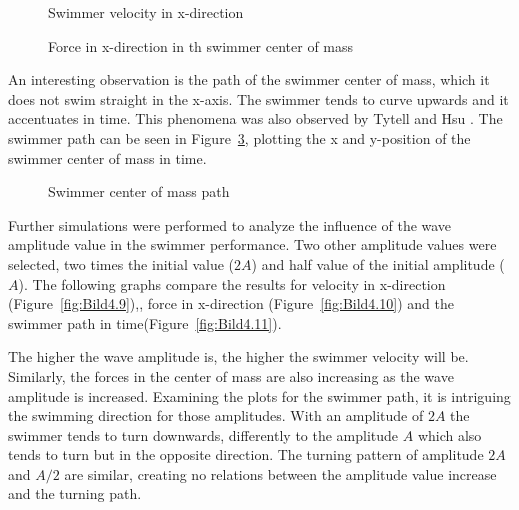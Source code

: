 \begin{figure}[H]
\centering
  \begin{footnotesize}
  
  \caption[Swimmer velocity in x-direction]{Swimmer velocity in x-direction}
   \label{fig:Bild4.6}
  \end{footnotesize}
\end{figure} 


\begin{figure}[H]
\centering
  \begin{footnotesize}
  
  \caption[Force in x-direction in th swimmer center of mass]{Force in x-direction in th swimmer center of mass}
   \label{fig:Bild4.7}
  \end{footnotesize}
\end{figure} 


An interesting observation is the path of the swimmer center of mass, which it does not swim straight in the x-axis. The swimmer tends to curve upwards and it accentuates in time.
This phenomena was also observed by Tytell and Hsu \cite{tytell_interactions_2010}. The swimmer path can be seen in Figure~\ref{fig:Bild4.8}, plotting the x and y-position of the
swimmer center of mass in time.


\begin{figure}[H]
\centering
  \begin{footnotesize}
  
  \caption[Swimmer center of mass path]{Swimmer center of mass path}
   \label{fig:Bild4.8}
  \end{footnotesize}
\end{figure} 


Further simulations were performed to analyze the influence of the wave amplitude value in the swimmer performance. Two other amplitude values were selected, two times the initial value
($2A$) and  half value of the initial amplitude ($A$). The following graphs compare the results for velocity in x-direction (Figure~\ref{fig:Bild4.9}),, force in x-direction
(Figure~\ref{fig:Bild4.10}) and the swimmer path in time(Figure~\ref{fig:Bild4.11}). \par
The higher the wave amplitude is, the higher the swimmer velocity will be. Similarly, the forces in the center of mass are also increasing
as the wave amplitude is increased. Examining the plots for the swimmer path, it is intriguing the swimming direction for those amplitudes. With an amplitude of $2A$ the swimmer
tends to turn downwards, differently to the amplitude $A$ which also tends to turn but in the opposite direction. The turning pattern of amplitude $2A$ and $A/2$ are similar, 
creating no relations between the amplitude value increase and the turning path.


